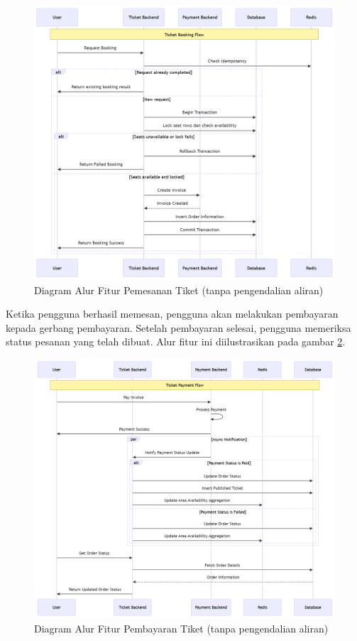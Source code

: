 \begin{figure}[htbp]
    \centering
    \includegraphics[width=1\textwidth]{resources/chapter-3/book-flow.png}
    \caption{Diagram Alur Fitur Pemesanan Tiket (tanpa pengendalian aliran)}
    \label{fig:flow-book-flow}
\end{figure}

\pagebreak

Ketika pengguna berhasil memesan, pengguna akan melakukan pembayaran kepada gerbang pembayaran. Setelah pembayaran selesai, pengguna memeriksa status pesanan yang telah dibuat. Alur fitur ini diilustrasikan pada gambar \ref{fig:flow-order-payment-flow}.

\begin{figure}[h]
    \centering
    \includegraphics[width=1\textwidth]{resources/chapter-3/order-payment.png}
    \caption{Diagram Alur Fitur Pembayaran Tiket (tanpa pengendalian aliran)}
    \label{fig:flow-order-payment-flow}
\end{figure}

